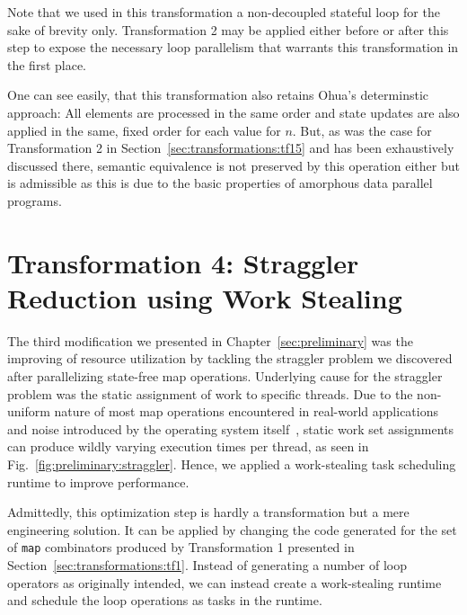 Note that we used in this transformation a non-decoupled stateful loop for the sake of brevity only.
Transformation 2 may be applied either before or after this step to expose the necessary loop parallelism that warrants this transformation in the first place.

One can see easily, that this transformation also retains Ohua's determinstic approach: All elements are processed in the same order and state updates are also applied in the same, fixed order for each value for $n$.
But, as was the case for Transformation 2 in Section~\ref{sec:transformations:tf15} and has been exhaustively discussed there, semantic equivalence is not preserved by this operation either but is admissible as this is due to the basic properties of amorphous data parallel programs.

\section{Transformation 4: Straggler Reduction using Work Stealing}%
\label{sec:transformations:tf3}

The third modification we presented in Chapter~\ref{sec:preliminary} was the improving of resource utilization by tackling the straggler problem we discovered after parallelizing state-free map operations.
Underlying cause for the straggler problem was the static assignment of work to specific threads.
Due to the non-uniform nature of most map operations encountered in real-world applications and noise introduced by the operating system itself~\cite{lackorzynski2016decoupled}, static work set assignments can produce wildly varying execution times per thread, as seen in Fig.~\ref{fig:preliminary:straggler}.
Hence, we applied a work-stealing task scheduling runtime to improve performance.

Admittedly, this optimization step is hardly a transformation but a mere engineering solution.
It can be applied by changing the code generated for the set of \texttt{map} combinators produced by Transformation 1 presented in Section~\ref{sec:transformations:tf1}.
Instead of generating a number of loop operators as originally intended, we can instead create a work-stealing runtime and schedule the loop operations as tasks in the runtime.
